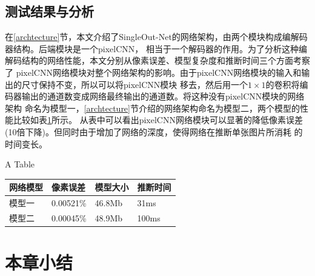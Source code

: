 \subsection{测试结果与分析}
	 在\ref{archtecture}节，本文介绍了SingleOut-Net的网络架构，由两个模块构成编解码器结构。后端模块是一个pixelCNN，
	 相当于一个解码器的作用。为了分析这种编解码结构的网络性能，本文分别从像素误差、模型复杂度和推断时间三个方面考察了
	 pixelCNN网络模块对整个网络架构的影响。由于pixelCNN网络模块的输入和输出的尺寸保持不变，所以可以将pixelCNN模块
	 移去，然后用一个$1\times1$的卷积将编码器输出的通道数变成网络最终输出的通道数。将这种没有pixelCNN模块的网络架构
	 命名为模型一，\ref{archtecture}节介绍的网络架构命名为模型二，两个模型的性能比较如表\ref{tab:performance}所示。
	 从表中可以看出pixelCNN网络模块可以显著的降低像素误差(10倍下降)。但同时由于增加了网络的深度，使得网络在推断单张图片所消耗
	 的时间变长。
\begin{table}[!hpb]
	\centering
    {A Table}
	\label{tab:performance}
	\begin{tabular}{p{70pt}p{70pt}p{70pt}p{70pt}}
	\toprule
	网络模型 & 像素误差 & 模型大小 & 推断时间 \\
	\midrule
	模型一 &  0.00521\% & 46.8Mb & 31ms \\
	模型二 & 0.00045\% & 48.9Mb & 100ms \\
	\bottomrule
\end{tabular}
\end{table}
	 
\section{本章小结}
	
	


